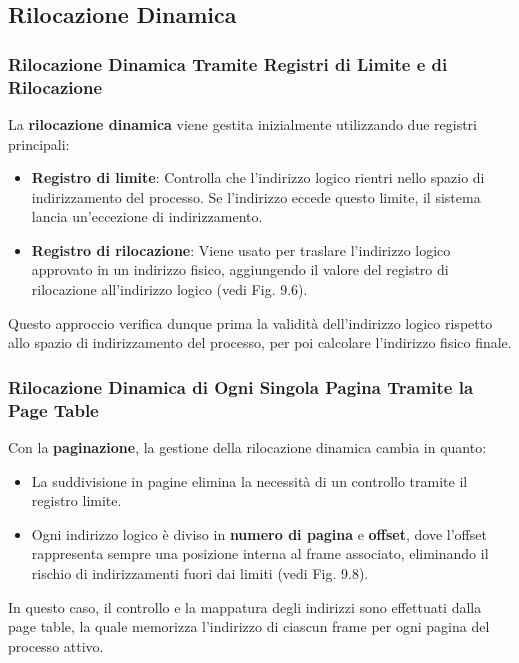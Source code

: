 
\subsection{Rilocazione Dinamica}

\subsubsection{Rilocazione Dinamica Tramite Registri di Limite e di Rilocazione}
La \textbf{rilocazione dinamica} viene gestita inizialmente utilizzando due registri principali:
\begin{itemize}
    \item \textbf{Registro di limite}: Controlla che l’indirizzo logico rientri nello spazio di indirizzamento del processo. Se l’indirizzo eccede questo limite, il sistema lancia un’eccezione di indirizzamento.
    \item \textbf{Registro di rilocazione}: Viene usato per traslare l’indirizzo logico approvato in un indirizzo fisico, aggiungendo il valore del registro di rilocazione all’indirizzo logico (vedi Fig. 9.6).
\end{itemize}
Questo approccio verifica dunque prima la validità dell'indirizzo logico rispetto allo spazio di indirizzamento del processo, per poi calcolare l’indirizzo fisico finale.
\subsubsection{Rilocazione Dinamica di Ogni Singola Pagina Tramite la Page Table}
Con la \textbf{paginazione}, la gestione della rilocazione dinamica cambia in quanto:
\begin{itemize}
    \item La suddivisione in pagine elimina la necessità di un controllo tramite il registro limite. 
    \item Ogni indirizzo logico è diviso in \textbf{numero di pagina} e \textbf{offset}, dove l’offset rappresenta sempre una posizione interna al frame associato, eliminando il rischio di indirizzamenti fuori dai limiti (vedi Fig. 9.8).
\end{itemize}
In questo caso, il controllo e la mappatura degli indirizzi sono effettuati dalla page table, la quale memorizza l’indirizzo di ciascun frame per ogni pagina del processo attivo.

